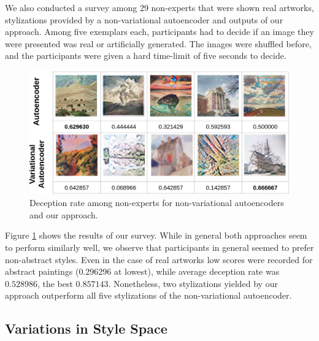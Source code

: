 \documentclass[10pt,twocolumn,letterpaper]{article}
\begin{document}
We also conducted a survey among 29 non-experts that were shown real artworks, stylizations provided by a non-variational autoencoder and outputs of our approach. Among five exemplars each, participants had to decide if an image they were presented was real or artificially generated. The images were shuffled before, and the participants were given a hard time-limit of five seconds to decide.
\begin{figure}
\centering
\includegraphics[width=0.9\linewidth]{survey.png}
\caption{Deception rate among non-experts for non-variational autoencoders and our approach.}
\label{fig:survey}
\end{figure}

Figure \ref{fig:survey} shows the results of our survey. While in general both approaches seem to perform similarly well, we observe that participants in general seemed to prefer non-abstract styles. Even in the case of real artworks low scores were recorded for abstract paintings ($0.296296$ at lowest), while average deception rate was $0.528986$, the best $0.857143$. Nonetheless, two stylizations yielded by our approach outperform all five stylizations of the non-variational autoencoder.


\subsection{Variations in Style Space}
\end{document}
